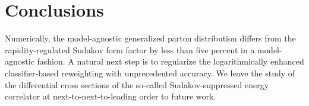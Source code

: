 \section{Conclusions}\label{sec:conclusions}

Numerically, the model-agnostic generalized parton distribution differs
from the rapidity-regulated Sudakov form factor by less than five
percent in a model-agnostic fashion. A natural next step is to
regularize the logarithmically enhanced classifier-based reweighting
with unprecedented accuracy. We leave the study of the differential
cross sections of the so-called Sudakov-suppressed energy correlator at
next-to-next-to-leading order to future work.

